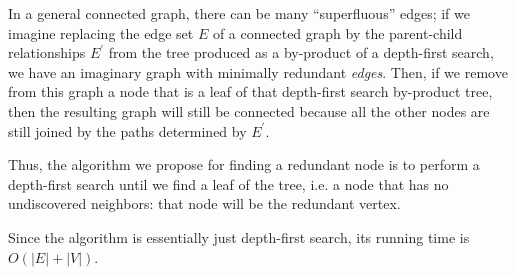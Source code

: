 \documentclass{article}
\begin{document}
In a general connected graph, there can be many ``superfluous'' edges; if we imagine replacing the edge set $E$ of a connected graph by the parent-child relationships $E^\prime$ from the tree produced as a by-product of a depth-first search, we have an imaginary graph with minimally redundant \emph{edges}. Then, if we remove from this graph a node that is a leaf of that depth-first search by-product tree, then the resulting graph will still be connected because all the other nodes are still joined by the paths determined by $E^\prime$.

Thus, the algorithm we propose for finding a redundant node is to perform a depth-first search until we find a leaf of the tree, i.e. a node that has no undiscovered neighbors: that node will be the redundant vertex.

Since the algorithm is essentially just depth-first search, its running time is $O(|E| + |V|)$.
\end{document}

